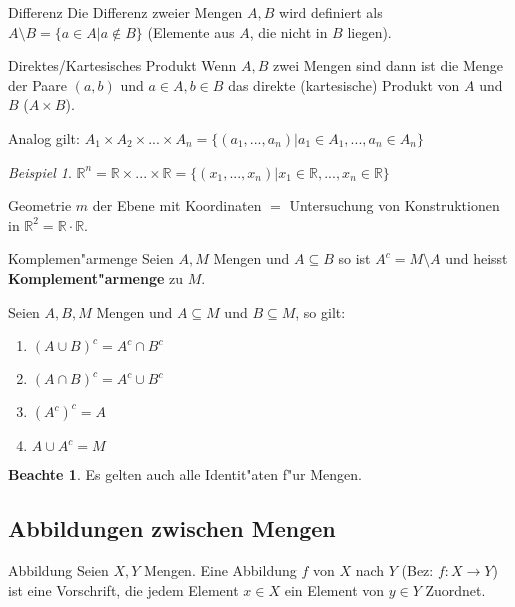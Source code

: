 \documentclass[11pt]{article}
\theoremstyle{remark}
\newtheorem{exa}{Beispiel}[section]
\theoremstyle{definition}
\newtheorem*{notte}{Beachte}
\theoremstyle{remark}
\begin{document}
\begin{definition}{Differenz}{}
Die Differenz zweier Mengen \(A, B\) wird definiert als \(A\setminus B = \{a\in A | a\not\in
B\}\) (Elemente aus \(A\), die nicht in \(B\) liegen). 
\end{definition}

\begin{definition}{Direktes/Kartesisches Produkt}{}
Wenn \(A,B\) zwei Mengen sind dann ist die Menge der Paare \((a,b)\) und \(a\in A,
b\in B\) das direkte (kartesische) Produkt von \(A\) und \(B\) (\(A\times B\)).
\end{definition}

Analog gilt: \(A_1\times A_2\times ... \times A_n = \{(a_1,...,a_n)| a_1\in A_1,...,a_n\in A_n\}\)

\begin{exa}
\(\mathbb{R}^n=\mathbb{R}\times ... \times \mathbb{R} =  \{(x_1,...,x_n)| x_1\in \mathbb{R},...,x_n\in \mathbb{R}\}\)
\end{exa}

Geometrie \(m\) der Ebene mit Koordinaten \(=\) Untersuchung von Konstruktionen in
\(\mathbb{R}^2=\mathbb{R}\cdot\mathbb{R}\).

\begin{definition}{Komplemen"armenge}
Seien \(A,M\) Mengen und \(A\subseteq B\) so ist \(A^c = M\setminus A\) und heisst
\textbf{Komplement"armenge} zu \(M\).
\end{definition}

Seien \(A,B,M\) Mengen und \(A\subseteq M\) und \(B\subseteq M\), so gilt:
\begin{relation}
\begin{enumerate}
\item \((A\cup B)^c = A^c \cap B^c\)
\item \((A\cap B)^c = A^c \cup B^c\)
\item \((A^c)^c = A\)
\item \(A\cup A^c = M\)
\end{enumerate}
\end{relation}

\begin{notte}
Es gelten auch alle Identit"aten f"ur Mengen.
\end{notte}


\subsection{Abbildungen zwischen Mengen}
\label{sec:org4ef8946}
\begin{definition}{Abbildung}{}
Seien \(X,Y\) Mengen. Eine Abbildung \(f\) von \(X\) nach \(Y\) (Bez: \(f:X\rightarrow
Y\)) ist eine Vorschrift, die jedem Element \(x\in X\) ein Element von
\(y\in Y\) Zuordnet.
\end{definition}
\end{document}
